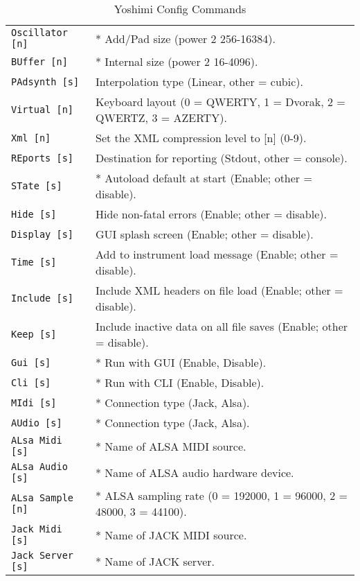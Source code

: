    \begin{table}[H]
      \centering
      \caption{Yoshimi Config Commands}
      \label{table:yoshimi_text_config_commands}
      \begin{tabular}{l l}

\texttt{Oscillator [n]} &
   * Add/Pad size (power 2 256-16384). \\
\texttt{BUffer [n]} &
   * Internal size (power 2 16-4096). \\
\texttt{PAdsynth [s]} &
   Interpolation type (Linear, other = cubic). \\
\texttt{Virtual [n]} &
   Keyboard layout (0 = QWERTY, 1 = Dvorak, 2 = QWERTZ, 3 = AZERTY). \\
\texttt{Xml [n]} &
   Set the XML compression level to [n] (0-9). \\
\texttt{REports [s]} &
   Destination for reporting (Stdout, other = console). \\
\texttt{STate [s]} &
   * Autoload default at start (Enable; other = disable). \\
\texttt{Hide [s]} &
   Hide non-fatal errors (Enable; other = disable). \\
\texttt{Display [s]} &
   GUI splash screen (Enable; other = disable). \\
\texttt{Time [s]} &
   Add to instrument load message (Enable; other = disable). \\
\texttt{Include [s]} &
   Include XML headers on file load (Enable; other = disable). \\
\texttt{Keep [s]} &
   Include inactive data on all file saves (Enable; other = disable). \\
\texttt{Gui [s]} &
   * Run with GUI (Enable, Disable). \\
\texttt{Cli [s]} &
   * Run with CLI (Enable, Disable). \\
\texttt{MIdi [s]} &
   * Connection type (Jack, Alsa). \\
\texttt{AUdio [s]} &
   * Connection type (Jack, Alsa). \\
\texttt{ALsa Midi [s]} &
   * Name of ALSA MIDI source. \\
\texttt{ALsa Audio [s]} &
   * Name of ALSA audio hardware device. \\
\texttt{ALsa Sample [n]} &
   * ALSA sampling rate (0 = 192000, 1 = 96000, 2 = 48000, 3 = 44100). \\
\texttt{Jack Midi [s]} &
   * Name of JACK MIDI source. \\
\texttt{Jack Server [s]} &
   * Name of JACK server. \\

\end{tabular}
\end{table}
